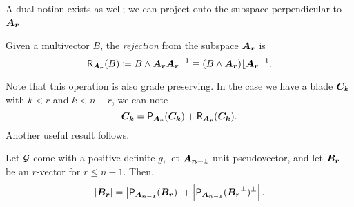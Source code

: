 A dual notion exists as well; we can project onto the subspace perpendicular to $\boldsymbol{A_r}$.
\begin{definition}
Given a multivector $B$, the \emph{rejection} from the subspace $\boldsymbol{A_r}$ is
\begin{equation}
\label{eq:rejection}
\mathsf{R}_{\boldsymbol{A_r}}(B) \coloneqq B \wedge \boldsymbol{A_r} \boldsymbol{A_r}^{-1} \equiv (B\wedge \boldsymbol{A_r})\lfloor \boldsymbol{A_r}^{-1}.
\end{equation}
\end{definition}
Note that this operation is also grade preserving. In the case we have a blade $\boldsymbol{C_k}$ with $k<r$ and $k<n-r$, we can note
\begin{equation}
\label{eq:projection+rejection_blade}
\boldsymbol{C_k}=\mathsf{P}_{\boldsymbol{A_r}}(\boldsymbol{C_k}) + \mathsf{R}_{\boldsymbol{A_r}}(\boldsymbol{C_k}).
\end{equation}
Another useful result follows.
\begin{proposition}
Let $\mathcal{G}$ come with a positive definite $g$, let $\boldsymbol{A_{n-1}}$ unit pseudovector, and let $\boldsymbol{B_r}$ be an $r$-vector for $r\leq n-1$. Then,
\begin{equation}
|\boldsymbol{B_r}| = \left|\mathsf{P}_{\boldsymbol{A_{n-1}}} (\boldsymbol{B_r})\right| + \left|\mathsf{P}_{\boldsymbol{A_{n-1}}}(\boldsymbol{B_r}^\perp)^\perp\right|.
\end{equation}
\end{proposition}
